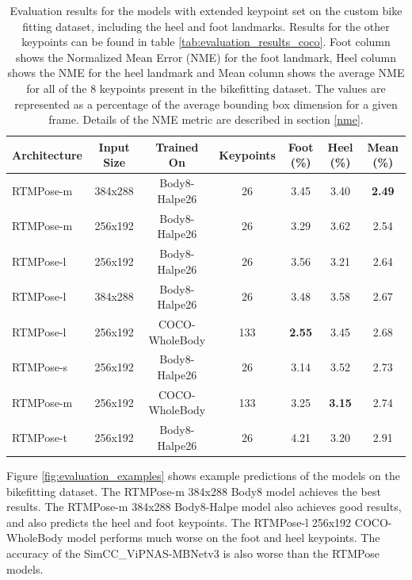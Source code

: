 \begin{table}[htbp]
    \setlength{\tabcolsep}{4pt}
    \centering
    \begin{tabular}{l cccccc}
        \toprule
        Architecture & Input Size & Trained On     & Keypoints & Foot (\%)     & Heel (\%)     & Mean (\%)     \\
        \midrule
        RTMPose-m    & 384x288    & Body8-Halpe26  & 26        & 3.45          & 3.40          & \textbf{2.49} \\
        RTMPose-m    & 256x192    & Body8-Halpe26  & 26        & 3.29          & 3.62          & 2.54          \\
        RTMPose-l    & 256x192    & Body8-Halpe26  & 26        & 3.56          & 3.21          & 2.64          \\
        RTMPose-l    & 384x288    & Body8-Halpe26  & 26        & 3.48          & 3.58          & 2.67          \\
        RTMPose-l    & 256x192    & COCO-WholeBody & 133       & \textbf{2.55} & 3.45          & 2.68          \\
        RTMPose-s    & 256x192    & Body8-Halpe26  & 26        & 3.14          & 3.52          & 2.73          \\
        RTMPose-m    & 256x192    & COCO-WholeBody & 133       & 3.25          & \textbf{3.15} & 2.74          \\
        RTMPose-t    & 256x192    & Body8-Halpe26  & 26        & 4.21          & 3.20          & 2.91          \\
        \bottomrule
    \end{tabular}
    \caption{Evaluation results for the models with extended keypoint set on the custom bike fitting dataset, including the heel and foot landmarks. Results for the other keypoints can be found in table \ref{tab:evaluation_results_coco}. Foot column shows the Normalized Mean Error (NME) for the foot landmark, Heel column shows the NME for the heel landmark and Mean column shows the average NME for all of the 8 keypoints present in the bikefitting dataset. The values are represented as a percentage of the average bounding box dimension for a given frame. Details of the NME metric are described in section \ref{nme}.}
    \label{tab:evaluation_results_wholebody}

\end{table}

Figure \ref{fig:evaluation_examples} shows example predictions of the models on the bikefitting dataset. The RTMPose-m 384x288 Body8 model achieves the best results. The RTMPose-m 384x288 Body8-Halpe model also achieves good results, and also predicts the heel and foot keypoints. The RTMPose-l 256x192 COCO-WholeBody model performs much worse on the foot and heel keypoints. The accuracy of the SimCC\_ViPNAS-MBNetv3 is also worse than the RTMPose models.

